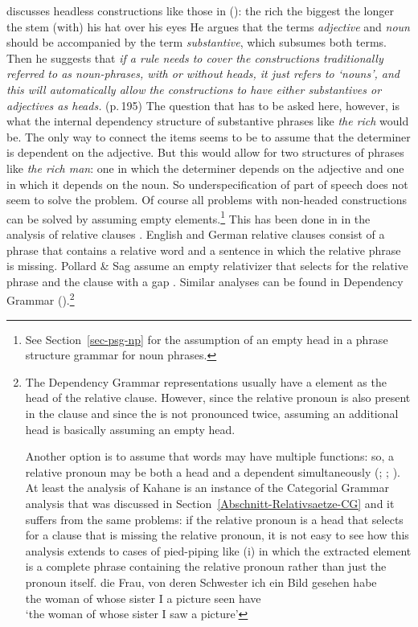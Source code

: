\addlines[2]
\citet[Section~4.E]{Hudson80a} discusses headless constructions like those in ():
\eal
\ex the rich
\ex the biggest
\ex the longer the stem
\ex (with) his hat over his eyes
\zl
He argues that the terms \emph{adjective} and \emph{noun} should be accompanied by the term
\emph{substantive}, which subsumes both terms. Then he suggests that \emph{if a rule needs to cover
  the constructions traditionally referred to as noun-phrases, with or without heads, it just
  refers to `nouns', and this will automatically allow the constructions to have either
substantives or adjectives as heads.} (p.\,195) The question that has to be asked here, however, is
what the internal dependency structure of substantive phrases like \emph{the rich} would be. The
only way to connect the items seems to be to assume that the determiner is dependent on the
adjective. But this would allow for two structures of phrases like \emph{the rich man}: one in which
the determiner depends on the adjective and one in which it depends on the noun. So
underspecification of part of speech does not seem to solve the problem. Of course all problems with
non-headed constructions can be solved by assuming empty elements.\footnote{%
 See Section~\ref{sec-psg-np} for the assumption of an empty head in a phrase structure grammar for
 noun phrases.}
This has been done in \hpsg in the analysis of relative clauses \citep[Chapter~5]{ps2}. English and German relative clauses consist of a
phrase that contains a relative word and a sentence in which the relative phrase is missing. Pollard
\& Sag assume an empty relativizer that selects for the relative phrase and the clause with a
gap \citep[--217]{ps2}. Similar analyses can be found in Dependency Grammar (\citealp[]{Eroms2000a}).\footnote{%
  The Dependency Grammar representations usually have a  element as the head of the relative
  clause. However, since the relative pronoun is also present in the clause and since the 
  is not pronounced twice, assuming an additional  head is basically assuming an empty
  head. 

  Another option is to assume that words may have multiple functions: so, a relative pronoun may be
  both a head and a dependent simultaneously (\citealp[Chapter 246, §8--11]{Tesniere2015a-u}; \citealp[\page xlvi]{KO2015a}; \citealp[--130]{Kahane2009a}). At least the analysis of Kahane is an instance of the Categorial
  Grammar analysis that was discussed in Section~\ref{Abschnitt-Relativsaetze-CG} and it suffers from the same problems: if the
  relative pronoun is a head that selects for a clause that is missing the relative pronoun, it is not easy to see how
  this analysis extends to cases of pied-piping like (i) in which the extracted element is a complete phrase
  containing the relative pronoun rather than just the pronoun itself.
\ea
\gll die Frau, von deren Schwester ich ein Bild gesehen habe\\
     the woman of whose sister I a picture seen have\\
\glt `the woman of whose sister I saw a picture'
\zlast
}
